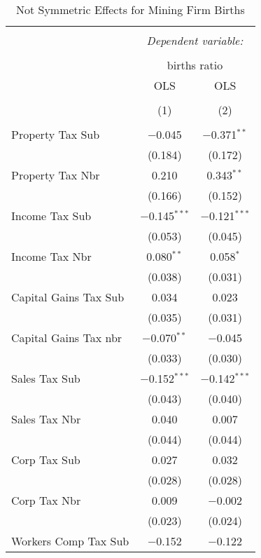 
\begin{table}[!htbp] \centering 
  \caption{Not Symmetric Effects for  Mining Firm Births} 
  \label{21noequality} 
\footnotesize 
\begin{tabular}{@{\extracolsep{5pt}}lcc} 
\\[-1.8ex]\hline 
\hline \\[-1.8ex] 
 & \multicolumn{2}{c}{\textit{Dependent variable:}} \\ 
\cline{2-3} 
\\[-1.8ex] & \multicolumn{2}{c}{births ratio} \\ 
 & OLS & OLS \\ 
\\[-1.8ex] & (1) & (2)\\ 
\hline \\[-1.8ex] 
 Property Tax Sub & $-$0.045 & $-$0.371$^{**}$ \\ 
  & (0.184) & (0.172) \\ 
  Property Tax Nbr & 0.210 & 0.343$^{**}$ \\ 
  & (0.166) & (0.152) \\ 
  Income Tax Sub & $-$0.145$^{***}$ & $-$0.121$^{***}$ \\ 
  & (0.053) & (0.045) \\ 
  Income Tax Nbr & 0.080$^{**}$ & 0.058$^{*}$ \\ 
  & (0.038) & (0.031) \\ 
  Capital Gains Tax Sub & 0.034 & 0.023 \\ 
  & (0.035) & (0.031) \\ 
  Capital Gains Tax nbr & $-$0.070$^{**}$ & $-$0.045 \\ 
  & (0.033) & (0.030) \\ 
  Sales Tax Sub & $-$0.152$^{***}$ & $-$0.142$^{***}$ \\ 
  & (0.043) & (0.040) \\ 
  Sales Tax Nbr & 0.040 & 0.007 \\ 
  & (0.044) & (0.044) \\ 
  Corp Tax Sub & 0.027 & 0.032 \\ 
  & (0.028) & (0.028) \\ 
  Corp Tax Nbr & 0.009 & $-$0.002 \\ 
  & (0.023) & (0.024) \\ 
  Workers Comp Tax Sub & $-$0.152 & $-$0.122 \\ 

\end{tabular}
\end{table}
